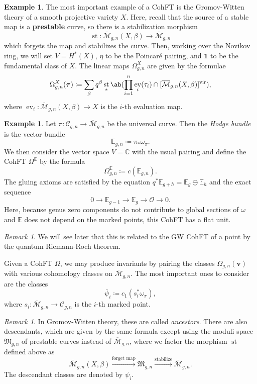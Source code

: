 \documentclass{amsart}
\theoremstyle{definition}
\newtheorem{exm}[thm]{Example}
\theoremstyle{remark}
\newtheorem{rmk}[thm]{Remark}
\theoremstyle{plain}
\theoremstyle{definition}
\theoremstyle{remark}
\newcommand{\C}{\mathbb{C}}
\newcommand{\E}{\mathbb{E}}
\newcommand{\Mbar}{\overline{\mathcal{M}}}
\newcommand{\mc}[1]{\mathcal{#1}}
\newcommand{\mf}[1]{\mathfrak{#1}}
\newcommand{\mbf}[1]{\mathbf{#1}}
\newcommand{\bv}{\mbf{v}}
\newcommand{\btau}{\bm{\tau}}
\newcommand{\mr}[1]{\mathrm{#1}}
\newcommand{\1}{\mathbf{1}}
\newcommand{\2}{\mathbf{2}}
\newcommand{\3}{\mathbf{3}}
\newcommand{\vir}{\mr{vir}}
\DeclareMathOperator{\ev}{ev}
\DeclareMathOperator{\st}{st}
\begin{document}
\begin{exm}
    The most important example of a CohFT is the Gromov-Witten theory of a smooth projective variety $X$. Here, recall that the source of a stable map is a \textbf{prestable} curve, so there is a stabilization morphism
    \[ \st \colon \Mbar_{g,n}(X,\beta) \to \Mbar_{g,n} \]
    which forgets the map and stabilizes the curve. Then, working over the Novikov ring, we will set $V = H^*(X)$, $\eta$ to be the Poincar\'e pairing, and $\1$ to be the fundamental class of $X$. The linear maps $\Omega^X_{g,n}$ are given by the formulae
    \[ \Omega_{g,n}^X(\btau) \coloneqq \sum_{\beta} q^{\beta} \st_* \ab(\prod_{i=1}^n \ev_i(\tau_i) \cap [\Mbar_{g,n}(X,\beta)]^{\vir}), \]
    where $\ev_i \colon \Mbar_{g,n}(X,\beta) \to X$ is the $i$-th evaluation map.
\end{exm}

\begin{exm}
    Let $\pi \colon \mc{C}_{g,n} \to \Mbar_{g,n}$ be the universal curve. Then the \textit{Hodge bundle} is the vector bundle 
    \[ \E_{g,n} \coloneqq \pi_* \omega_{\pi}. \]
    We then consider the vector space $V = \C$ with the usual pairing and define the CohFT $\Omega^{\E}$ by the formula
    \[ \Omega^{\E}_{g,n} \coloneqq c(\E_{g,n}). \]
    The gluing axioms are satisfied by the equation $q^* \E_{g+h} = \E_g \oplus \E_h$ and the exact sequence
    \[ 0 \to \E_{g-1} \to \E_g \to \mc{O} \to 0. \]
    Here, because genus zero components do not contribute to global sections of $\omega$ and $\E$ does not depend on the marked points, this CohFT has a flat unit.
\end{exm}

\begin{rmk}
    We will see later that this is related to the GW CohFT of a point by the quantum Riemann-Roch theorem. 
\end{rmk}

Given a CohFT $\Omega$, we may produce invariants by pairing the classes $\Omega_{g,n}(\bv)$ with various cohomology classes on $\Mbar_{g,n}$. The most important ones to consider are the classes
\[ \bar{\psi}_i \coloneqq c_1( s_i^* \omega_{\pi} ), \]
where $s_i \colon \Mbar_{g,n} \to \mc{C}_{g,n}$ is the $i$-th marked point.

\begin{rmk}
    In Gromov-Witten theory, these are called \textit{ancestors}. There are also descendants, which are given by the same formula except using the moduli space $\mf{M}_{g,n}$ of prestable curves instead of $\Mbar_{g,n}$, where we factor the morphism $\st$ defined above as
    \[ \Mbar_{g,n}(X,\beta) \xrightarrow{\text{forget map}} \mf{M}_{g,n} \xrightarrow{\text{stabilize}} \Mbar_{g,n}. \]
    The descendant classes are denoted by $\psi_i$.
\end{rmk}
\end{document}
